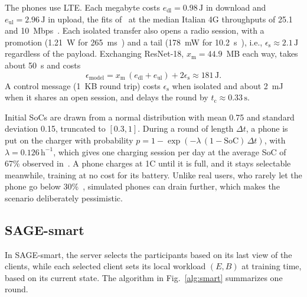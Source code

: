 The phones use LTE. Each megabyte costs $e_{\mathrm{dl}}=0.98\,\mathrm{J}$ in
download and $e_{\mathrm{ul}}=2.96\,\mathrm{J}$ in upload, the fits
of~\cite{narayanan2021variegated} at the median Italian 4G throughputs of 25.1
and 10~Mbps~\cite{opensignal2018italy}. Each isolated transfer also opens a
radio session, with a promotion (1.21~W for
265~ms~\cite{huang2012lte,narayanan2021variegated}) and a tail (178~mW for
10.2~s~\cite{narayanan2021variegated}), i.e.,
$\epsilon_{\mathrm{s}}\approx2.1\,\mathrm{J}$ regardless of the payload.
Exchanging ResNet-18, $x_{\mathrm{m}}=44.9$~MB each way, takes about 50~s and
costs
\begin{equation}
  \epsilon_{\mathrm{model}} = x_{\mathrm{m}}\,(e_{\mathrm{dl}}+e_{\mathrm{ul}})
  + 2\epsilon_{\mathrm{s}} \approx 181\,\mathrm{J}.
  \label{eq:comm}
\end{equation}
A control message (1~KB round trip) costs $\epsilon_{\mathrm{s}}$ when isolated
and about 2~mJ when it shares an open session, and delays the round by
$t_{\mathrm{c}}\approx0.33\,\mathrm{s}$.

Initial SoCs are drawn from a normal distribution with mean 0.75 and standard
deviation 0.15, truncated to $[0.3,1]$. During a round of length $\Delta t$, a
phone is put on the charger with probability
$p = 1-\exp\!\left(-\lambda\,(1-\mathrm{SoC})\,\Delta t\right)$, with
$\lambda=0.126\,\mathrm{h}^{-1}$, which gives one charging session per day at
the average SoC of 67\% observed in~\cite{ferreira2011battery}. A phone charges
at 1C until it is full, and it stays selectable meanwhile, training at no cost
for its battery. Unlike real users, who rarely let the phone go below
30\%~\cite{ferreira2011battery}, simulated phones can drain further, which
makes the scenario deliberately pessimistic.

\subsection{SAGE-smart}\label{sec:smart}

In SAGE-smart, the server selects the participants based on its last view of
the clients, while each selected client sets its local workload $(E, B)$ at
training time, based on its current state. The algorithm in
Fig.~\ref{alg:smart} summarizes one round.

